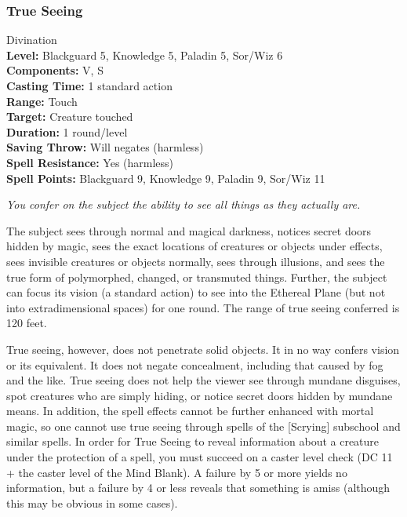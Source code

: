 \subsubsection{True Seeing}
\label{Spell:TrueSeeing}
Divination
\\ \textbf{Level:} Blackguard 5, Knowledge 5, Paladin 5, Sor/Wiz 6
\\ \textbf{Components:} V, S
\\ \textbf{Casting Time:}  1 standard action
\\ \textbf{Range:} Touch
\\ \textbf{Target:} Creature touched
\\ \textbf{Duration:} 1 round/level
\\ \textbf{Saving Throw:} Will negates (harmless)
\\ \textbf{Spell Resistance:} Yes (harmless)
\\ \textbf{Spell Points:} Blackguard 9, Knowledge 9, Paladin 9, Sor/Wiz 11

\emph{You confer on the subject the ability to see all things as they actually are.}

The subject sees through normal and magical darkness, notices secret doors hidden by magic, 
sees the exact locations of creatures or objects under  effects, sees invisible creatures or objects normally, 
sees through illusions, and sees the true form of polymorphed, changed, or transmuted things. 
Further, the subject can focus its vision (a standard action) to see into the Ethereal Plane (but not into extradimensional spaces) for one round. 
The range of true seeing conferred is 120 feet.

True seeing, however, does not penetrate solid objects. 
It in no way confers  vision or its equivalent. 
It does not negate concealment, including that caused by fog and the like. 
True seeing does not help the viewer see through mundane disguises, spot creatures who are simply hiding, or notice secret doors hidden by mundane means. 
In addition, the spell effects cannot be further enhanced with mortal magic, so one cannot use true seeing through spells of the [Scrying] subschool and similar spells.
In order for True Seeing to reveal information about a creature under the protection of a  spell, 
you must succeed on a caster level check (DC 11 + the caster level of the Mind Blank). 
A failure by 5 or more yields no information, but a failure by 4 or less reveals that something is amiss (although this may be obvious in some cases).

